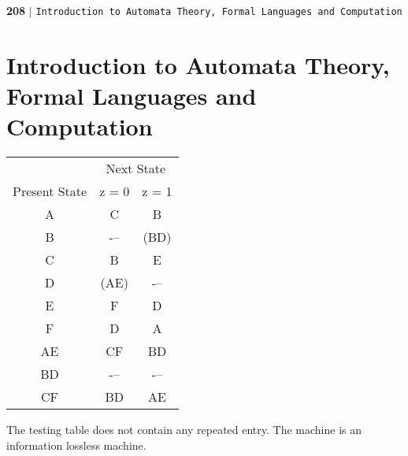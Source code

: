 \documentclass[a4,9pt]{beamer}
\begin{document}
\begin{frame}
 \begin{flushleft}
    \textbf{208}\hspace*{0.1cm} \textbf{$|$} \hspace*{0.1cm} {\small \texttt{Introduction to Automata Theory, Formal Languages and Computation}}
  \end{flushleft}
\section*{Introduction to Automata Theory, Formal Languages and Computation}
\vspace*{0.5cm}

\pause
\begin{center}
  \begin{tabular}{ccc}
\hline

\hline

\hline

\hline
 & \multicolumn{2}{c}{Next State}\\
 \cline{2-3}
Present State & z = 0 & z = 1\\
\hline
 A    &   C    &       B     \\
 B    &   -–   &      (BD)   \\
 C    &   B    &       E     \\
 D    &  (AE)  &       -–    \\
 E    &   F    &       D     \\
 F    &   D    &       A     \\
\hline
 AE   &   CF   &       BD     \\
 BD   &   -–   &       -–     \\
 CF   &   BD   &       AE     \\
\hline

\hline

\hline

\hline

  \end{tabular}
\end{center}

\pause
\hspace*{0.1cm} The testing table does not contain any repeated entry. The machine is an information lossless machine.\\
\end{frame}
\end{document}
